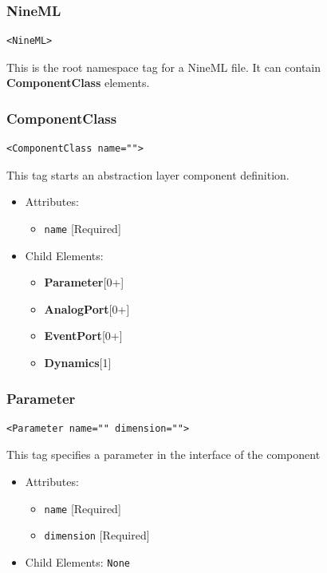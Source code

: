 \documentclass{article}
\newcommand{\ComponentClass}{{\bf{ComponentClass}}\xspace}
\newcommand{\Dynamics}{{\bf{Dynamics}}\xspace}
\newcommand{\AnalogPort}{{\bf{AnalogPort}}\xspace}
\newcommand{\EventPort}{{\bf{EventPort}}\xspace}
\newcommand{\Parameter}{{\bf{Parameter}}\xspace}
\begin{document}
\subsubsection{NineML}
%
\begin{lstlisting}
<NineML>
\end{lstlisting}

This is the root namespace tag for a NineML file. It can contain
\ComponentClass elements.

\subsubsection{ComponentClass}
%
\begin{lstlisting}
<ComponentClass name="">
\end{lstlisting}

This tag starts an abstraction layer component definition.

\begin{itemize}
\item Attributes:
%
\begin{itemize}
\item \verb|name| {[}Required{]}
\end{itemize}

\item Child Elements:
%
\begin{itemize}
\item \Parameter {[}0+{]}
\item \AnalogPort{[}0+{]}
\item \EventPort {[}0+{]}
\item \Dynamics  {[}1{]}
\end{itemize}

\end{itemize}

\subsubsection{Parameter}
%
\begin{lstlisting}
<Parameter name="" dimension="">
\end{lstlisting}

This tag specifies a parameter in the interface of the component

\begin{itemize}
\item Attributes:
%
\begin{itemize}
\item \verb|name| {[}Required{]}
\item \verb|dimension| {[}Required{]}
\end{itemize}

\item Child Elements: \texttt{None}
\end{itemize}
\end{document}
